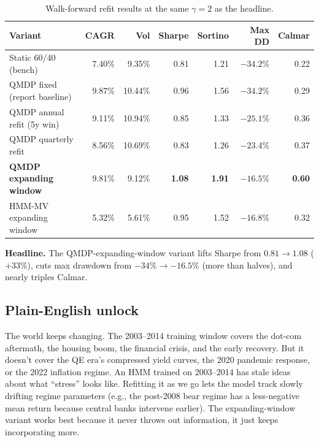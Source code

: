 \documentclass[11pt]{article}
\begin{document}
\begin{table}[H]\centering\small\setlength{\tabcolsep}{6pt}\renewcommand{\arraystretch}{1.1}
\caption{Walk-forward refit results at the same $\gamma = 2$ as the headline.}\label{tab:walkforward}
\begin{tabular}{l rrrrrr}
\toprule
\textbf{Variant} & \textbf{CAGR} & \textbf{Vol} & \textbf{Sharpe} & \textbf{Sortino} & \textbf{Max DD} & \textbf{Calmar} \\
\midrule
Static 60/40 (bench)         & 7.40\% & 9.35\%  & 0.81 & 1.21 & $-34.2\%$ & 0.22 \\
QMDP fixed (report baseline) & 9.87\% & 10.44\% & 0.96 & 1.56 & $-34.2\%$ & 0.29 \\
QMDP annual refit (5y win)   & 9.11\% & 10.94\% & 0.85 & 1.33 & $-25.1\%$ & 0.36 \\
QMDP quarterly refit         & 8.56\% & 10.69\% & 0.83 & 1.26 & $-23.4\%$ & 0.37 \\
\rowcolor{cg!15}\textbf{QMDP expanding window} & 9.81\% & 9.12\%  & \textbf{1.08} & \textbf{1.91} & $\mathbf{-16.5\%}$ & \textbf{0.60} \\
HMM-MV expanding window      & 5.32\% & 5.61\%  & 0.95 & 1.52 & $-16.8\%$ & 0.32 \\
\bottomrule
\end{tabular}
\end{table}

\textbf{Headline.} The QMDP-expanding-window variant lifts Sharpe from $0.81 \to 1.08$ ($+33\%$), cuts max drawdown from $-34\% \to -16.5\%$ (more than halves), and nearly triples Calmar.

\subsection{Plain-English unlock}

\begin{plainenglish}
The world keeps changing. The 2003--2014 training window covers the dot-com aftermath, the housing boom, the financial crisis, and the early recovery. But it doesn't cover the QE era's compressed yield curves, the 2020 pandemic response, or the 2022 inflation regime. An HMM trained on 2003--2014 has stale ideas about what ``stress'' looks like. Refitting it as we go lets the model track slowly drifting regime parameters (e.g., the post-2008 bear regime has a less-negative mean return because central banks intervene earlier). The expanding-window variant works best because it never throws out information, it just keeps incorporating more.
\end{plainenglish}
\end{document}
